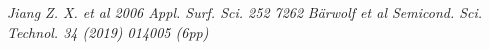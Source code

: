 \documentclass[a4paper,10pt]{article}
\begin{document}


\begin{thebibliography}{9}
 \emph{Jiang Z. X. et al 2006 Appl. Surf. Sci. 252 7262} 
 \emph{Bärwolf et al Semicond. Sci. Technol. 34 (2019) 014005 (6pp)} 
\end{thebibliography}
\end{document}
